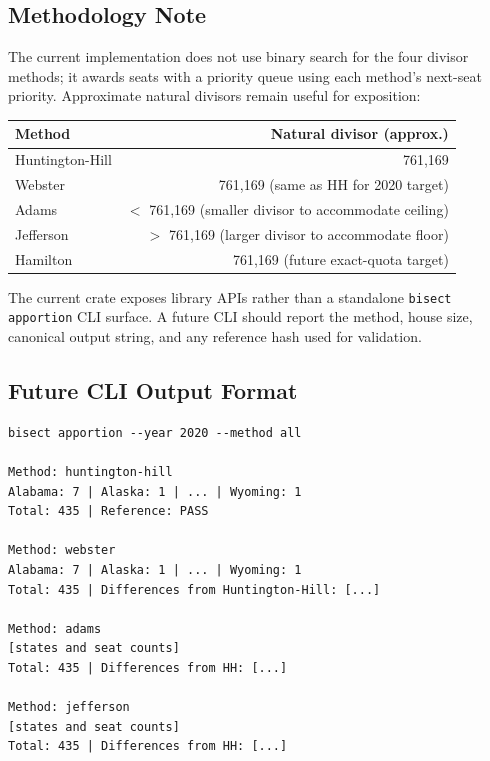 \subsection{Methodology Note}

The current implementation does not use binary search for the four divisor
methods; it awards seats with a priority queue using each method's next-seat
priority.  Approximate natural divisors remain useful for exposition:
\begin{center}
\begin{tabular}{lr}
\toprule
Method & Natural divisor (approx.) \\
\midrule
Huntington-Hill & 761,169 \\
Webster         & 761,169 (same as HH for 2020 target) \\
Adams           & $<$ 761,169 (smaller divisor to accommodate ceiling) \\
Jefferson       & $>$ 761,169 (larger divisor to accommodate floor) \\
Hamilton        & 761,169 (future exact-quota target) \\
\bottomrule
\end{tabular}
\end{center}
The current crate exposes library APIs rather than a standalone
\texttt{bisect apportion} CLI surface.  A future CLI should report the method,
house size, canonical output string, and any reference hash used for validation.

\subsection{Future CLI Output Format}

\begin{verbatim}
bisect apportion --year 2020 --method all

Method: huntington-hill
Alabama: 7 | Alaska: 1 | ... | Wyoming: 1
Total: 435 | Reference: PASS

Method: webster
Alabama: 7 | Alaska: 1 | ... | Wyoming: 1
Total: 435 | Differences from Huntington-Hill: [...]

Method: adams
[states and seat counts]
Total: 435 | Differences from HH: [...]

Method: jefferson
[states and seat counts]
Total: 435 | Differences from HH: [...]
\end{verbatim}
